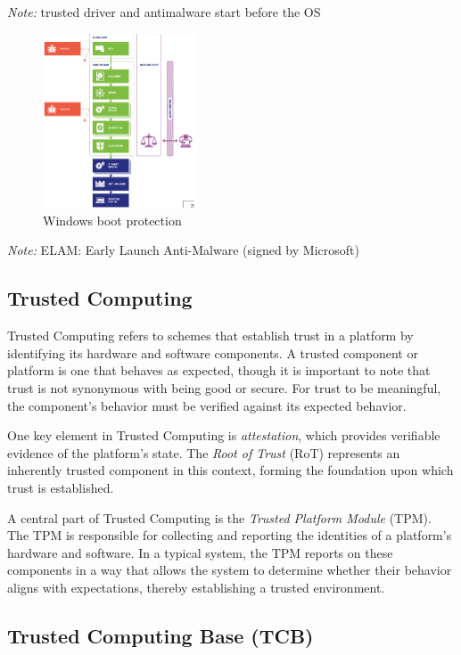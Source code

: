 \textit{Note:} trusted driver and antimalware start before the OS

\begin{figure}
    \centering
    \includegraphics[width=0.4\textwidth]{img/windowd-boot.png}
    \caption{Windows boot protection}
\end{figure}

\textit{Note:} ELAM: Early Launch Anti-Malware (signed by Microsoft)

\subsection{Trusted Computing}

Trusted Computing refers to schemes that establish trust in a platform by identifying its hardware and software components. A trusted component or platform is one that behaves as expected, though it is important to note that trust is not synonymous with being good or secure. For trust to be meaningful, the component's behavior must be verified against its expected behavior.

One key element in Trusted Computing is \textit{attestation}, which provides verifiable evidence of the platform’s state. The \textit{Root of Trust} (RoT) represents an inherently trusted component in this context, forming the foundation upon which trust is established.

A central part of Trusted Computing is the \textit{Trusted Platform Module} (TPM). The TPM is responsible for collecting and reporting the identities of a platform's hardware and software. In a typical system, the TPM reports on these components in a way that allows the system to determine whether their behavior aligns with expectations, thereby establishing a trusted environment.


\subsection{Trusted Computing Base (TCB)}

